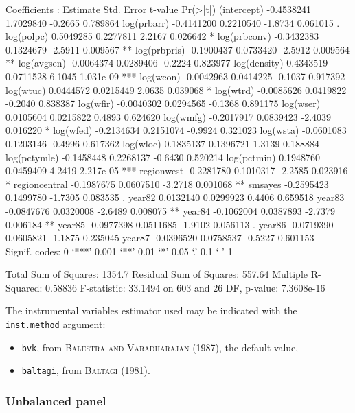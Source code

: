 \documentclass[a4paper]{article}
\begin{document}
\begin{Schunk}
\begin{Soutput}
Coefficients :
                Estimate Std. Error t-value  Pr(>|t|)    
(intercept)   -0.4538241  1.7029840 -0.2665  0.789864    
log(prbarr)   -0.4141200  0.2210540 -1.8734  0.061015 .  
log(polpc)     0.5049285  0.2277811  2.2167  0.026642 *  
log(prbconv)  -0.3432383  0.1324679 -2.5911  0.009567 ** 
log(prbpris)  -0.1900437  0.0733420 -2.5912  0.009564 ** 
log(avgsen)   -0.0064374  0.0289406 -0.2224  0.823977    
log(density)   0.4343519  0.0711528  6.1045 1.031e-09 ***
log(wcon)     -0.0042963  0.0414225 -0.1037  0.917392    
log(wtuc)      0.0444572  0.0215449  2.0635  0.039068 *  
log(wtrd)     -0.0085626  0.0419822 -0.2040  0.838387    
log(wfir)     -0.0040302  0.0294565 -0.1368  0.891175    
log(wser)      0.0105604  0.0215822  0.4893  0.624620    
log(wmfg)     -0.2017917  0.0839423 -2.4039  0.016220 *  
log(wfed)     -0.2134634  0.2151074 -0.9924  0.321023    
log(wsta)     -0.0601083  0.1203146 -0.4996  0.617362    
log(wloc)      0.1835137  0.1396721  1.3139  0.188884    
log(pctymle)  -0.1458448  0.2268137 -0.6430  0.520214    
log(pctmin)    0.1948760  0.0459409  4.2419 2.217e-05 ***
regionwest    -0.2281780  0.1010317 -2.2585  0.023916 *  
regioncentral -0.1987675  0.0607510 -3.2718  0.001068 ** 
smsayes       -0.2595423  0.1499780 -1.7305  0.083535 .  
year82         0.0132140  0.0299923  0.4406  0.659518    
year83        -0.0847676  0.0320008 -2.6489  0.008075 ** 
year84        -0.1062004  0.0387893 -2.7379  0.006184 ** 
year85        -0.0977398  0.0511685 -1.9102  0.056113 .  
year86        -0.0719390  0.0605821 -1.1875  0.235045    
year87        -0.0396520  0.0758537 -0.5227  0.601153    
---
Signif. codes:  0 ‘***’ 0.001 ‘**’ 0.01 ‘*’ 0.05 ‘.’ 0.1 ‘ ’ 1 

Total Sum of Squares: 1354.7
Residual Sum of Squares: 557.64
Multiple R-Squared: 0.58836
F-statistic: 33.1494 on 603 and 26 DF, p-value: 7.3608e-16
\end{Soutput}
\end{Schunk}

The instrumental variables estimator used may be indicated with the
\texttt{inst.method} argument:
\begin{itemize}
\item \texttt{bvk}, from  \textsc{Balestra and Varadharajan} (1987), the default value,
\item \texttt{baltagi}, from \textsc{Baltagi} (1981).
\end{itemize}


\subsubsection{Unbalanced panel}
\end{document}
